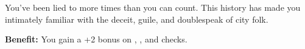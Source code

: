 
You’ve been lied to more times than you can count. This history has made you intimately familiar with the deceit, guile, and doublespeak of city folk.

\textbf{Benefit:} You gain a +2 bonus on , , and  checks.